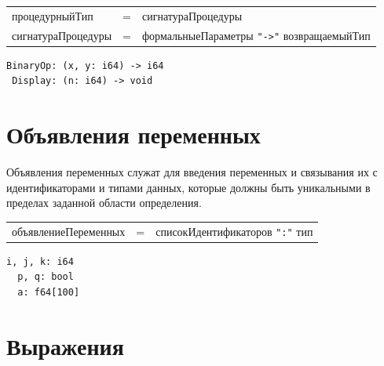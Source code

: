 \documentclass[a4paper,12pt]{article}
\newcommand{\lit}[1]{\texttt{"#1"}}
\begin{document}
    \begin{center}
        \begin{tabular}{l c l}
            процедурныйТип & = & сигнатураПроцедуры \\
            сигнатураПроцедуры & = & формальныеПараметры \lit{->} возвращаемыйТип
        \end{tabular}
    \end{center}

    \begin{center}
        \begin{minipage}[t]{0.5\textwidth}
            \begin{lstlisting}[style=obouldstyle]
 BinaryOp: (x, y: i64) -> i64
 Display: (n: i64) -> void
            \end{lstlisting}
        \end{minipage}
    \end{center}


    \section{Объявления переменных}

    Объявления переменных служат для введения переменных и связывания их с идентификаторами и типами данных, которые должны быть уникальными в пределах заданной области определения.

    \begin{center}
        \begin{tabular}{l c l}
            объявлениеПеременных & = & списокИдентификаторов \lit{:} тип
        \end{tabular}
    \end{center}

    \begin{center}
        \begin{minipage}[t]{0.5\textwidth}
            \begin{lstlisting}[style=obouldstyle]
  i, j, k: i64
  p, q: bool
  a: f64[100]
            \end{lstlisting}
        \end{minipage}
    \end{center}



    \section{Выражения}
\end{document}
